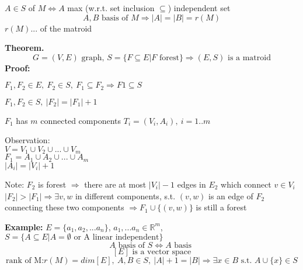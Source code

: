 \begin{definition}
	$A\in S$  of $M \Leftrightarrow A$ max (w.r.t. set inclusion $\subseteq$) independent set
	\[
	A, B \text{ basis of } M \Rightarrow |A| = |B| = r(M)
	\]
	$r(M)$...  of the matroid
\end{definition}

\textbf{Theorem.} 
\[G=(V,E) \text{ graph, }S=\{F\subseteq E | F \text{ forest}\} \Rightarrow (E,S) \text{ is a matroid}\]
\textbf{Proof:}
\begin{compactenum}[(1)]
	\item{$F_1, F_2 \in E,~F_2\in S,~F_1\subseteq F_2\Rightarrow F1\subseteq S$}
	\item{$F_1, F_2\in S, ~|F_2| = |F_1| + 1$}
	\item{$F_1$} has $m$ connected components $T_i=(V_i, A_i),~i=1..m$
	\item{Observation: \\
	$V=V_1\cup V_2\cup ... \cup V_m$\\
	$F_1 = A_1\cup A_2\cup ... \cup A_m$\\
	$|A_i|=|V_i|+1$}
	\item{}
	\item{Note: $F_2$ is forest $\Rightarrow$ there are at most $|V_i|-1$ edges in $E_2$ which connect $v\in V_i$ $|F_2| > |F_1| \Rightarrow \exists v,w $ in different components, s.t. $(v,w)$ is an edge of $F_2$ connecting these two components $\Rightarrow F_1\cup\{(v,w)\}$ is still a forest}
\end{compactenum}


\textbf{Example:} $E=\{a_1, a_2, ... a_n\}$, $a_1, ... a_n \in \mathbb{R}^m$, 
$S = \{A\subseteq E | A=\emptyset \text{ or A linear independent}\}$\\
\[A \text{ basis of } S \Leftrightarrow A \text{ basis }
\]
\[
	[E] \text{ is a vector space}
\]
\[
	\text{rank of M:} r(M) = dim[E],~A,B\in S,~|A|+1=|B|\Rightarrow \exists x\in B \text{ s.t. } A\cup \{x\}\in S
\]